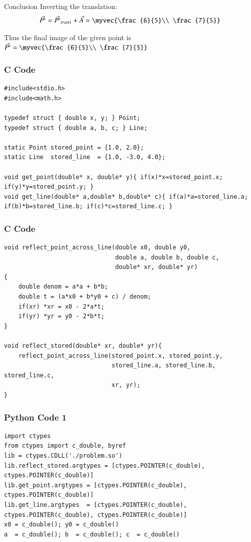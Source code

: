 \documentclass{beamer}
\begin{document}
\begin{frame}{Conclusion}
Inverting the translation:
\begin{align}
    \vec{P'}=\vec{P'}_{trans}+\vec{A}=\myvec{\frac{6}{5}\\ \frac{7}{5}}
\end{align}

Thus the final image of the given point is $\vec{P'}=\myvec{\frac{6}{5}\\ \frac{7}{5}}$
\end{frame}

\begin{frame}[fragile]
    \frametitle{C Code}
    \begin{lstlisting}
#include<stdio.h>
#include<math.h>

typedef struct { double x, y; } Point;
typedef struct { double a, b, c; } Line;

static Point stored_point = {1.0, 2.0};
static Line  stored_line  = {1.0, -3.0, 4.0};

void get_point(double* x, double* y){ if(x)*x=stored_point.x; if(y)*y=stored_point.y; }
void get_line(double* a,double* b,double* c){ if(a)*a=stored_line.a; if(b)*b=stored_line.b; if(c)*c=stored_line.c; }
    \end{lstlisting}
\end{frame}

\begin{frame}[fragile]
    \frametitle{C Code}
    \begin{lstlisting}
void reflect_point_across_line(double x0, double y0,
                               double a, double b, double c,
                               double* xr, double* yr)
{
    double denom = a*a + b*b;
    double t = (a*x0 + b*y0 + c) / denom;
    if(xr) *xr = x0 - 2*a*t;
    if(yr) *yr = y0 - 2*b*t;
}

void reflect_stored(double* xr, double* yr){
    reflect_point_across_line(stored_point.x, stored_point.y,
                              stored_line.a, stored_line.b, stored_line.c,
                              xr, yr);
}
    \end{lstlisting}
\end{frame}

\begin{frame}[fragile]
    \frametitle{Python Code 1}
    \begin{lstlisting}
import ctypes
from ctypes import c_double, byref
lib = ctypes.CDLL('./problem.so')
lib.reflect_stored.argtypes = [ctypes.POINTER(c_double), ctypes.POINTER(c_double)]
lib.get_point.argtypes = [ctypes.POINTER(c_double), ctypes.POINTER(c_double)]
lib.get_line.argtypes  = [ctypes.POINTER(c_double), ctypes.POINTER(c_double), ctypes.POINTER(c_double)]
x0 = c_double(); y0 = c_double()
a  = c_double(); b  = c_double(); c  = c_double()
    \end{lstlisting}
\end{frame}
\end{document}
